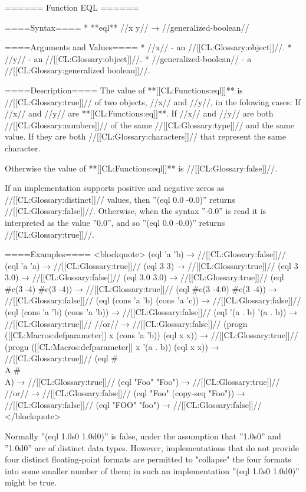 ====== Function EQL ======

====Syntax====
  * **eql** //x y// → //generalized-boolean//

====Arguments and Values====
  * //x// - an //[[CL:Glossary:object]]//.
  * //y// - an //[[CL:Glossary:object]]//.
  * //generalized-boolean// - a //[[CL:Glossary:generalized boolean]]//.

====Description====
The value of **[[CL:Functions:eql]]** is //[[CL:Glossary:true]]// of two objects, //x// and //y//, in the folowing cases: \beginlist {} If //x// and //y// are **[[CL:Functions:eq]]**.  If //x// and //y// are both //[[CL:Glossary:numbers]]// of the same //[[CL:Glossary:type]]// and the same value.  If they are both //[[CL:Glossary:characters]]// that represent the same character. \endlist

Otherwise the value of **[[CL:Functions:eql]]** is //[[CL:Glossary:false]]//.

If an implementation supports positive and negative zeros as //[[CL:Glossary:distinct]]// values, then ''(eql 0.0 -0.0)'' returns //[[CL:Glossary:false]]//. Otherwise, when the syntax ''-0.0'' is read it is interpreted as the value ''0.0'', and so ''(eql 0.0 -0.0)'' returns //[[CL:Glossary:true]]//.

====Examples====
<blockquote> (eql 'a 'b) → //[[CL:Glossary:false]]// (eql 'a 'a) → //[[CL:Glossary:true]]// (eql 3 3) → //[[CL:Glossary:true]]// (eql 3 3.0) → //[[CL:Glossary:false]]// (eql 3.0 3.0) → //[[CL:Glossary:true]]// (eql #c(3 -4) #c(3 -4)) → //[[CL:Glossary:true]]// (eql #c(3 -4.0) #c(3 -4)) → //[[CL:Glossary:false]]// (eql (cons 'a 'b) (cons 'a 'c)) → //[[CL:Glossary:false]]// (eql (cons 'a 'b) (cons 'a 'b)) → //[[CL:Glossary:false]]// (eql '(a . b) '(a . b)) → //[[CL:Glossary:true]]// //or// → //[[CL:Glossary:false]]// (progn ([[CL:Macros:defparameter]] x (cons 'a 'b)) (eql x x)) → //[[CL:Glossary:true]]// (progn ([[CL:Macros:defparameter]] x '(a . b)) (eql x x)) → //[[CL:Glossary:true]]// (eql #\\A #\\A) → //[[CL:Glossary:true]]// (eql "Foo" "Foo") → //[[CL:Glossary:true]]// //or// → //[[CL:Glossary:false]]// (eql "Foo" (copy-seq "Foo")) → //[[CL:Glossary:false]]// (eql "FOO" "foo") → //[[CL:Glossary:false]]// </blockquote>

Normally ''(eql 1.0s0 1.0d0)'' is false, under the assumption that ''1.0s0'' and ''1.0d0'' are of distinct data types. However, implementations that do not provide four distinct floating-point formats are permitted to "collapse" the four formats into some smaller number of them; in such an implementation ''(eql 1.0s0 1.0d0)'' might be true.

